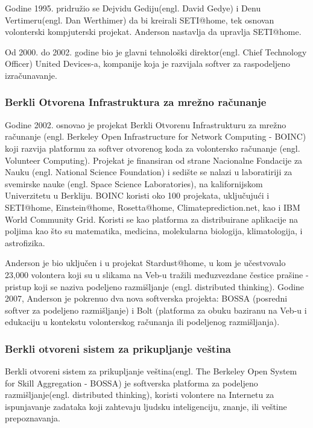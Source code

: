 \documentclass[titlepage, 12pt]{article}
\begin{document}
Godine 1995. pridružio se Dejvidu Gediju(engl. David Gedye) i Denu Vertimeru(engl. Dan Werthimer) da bi kreirali SETI@home, tek osnovan volonterski kompjuterski projekat. Anderson nastavlja da upravlja SETI@home.

Od 2000. do 2002. godine bio je glavni tehnološki direktor(engl. Chief Technology Officer) United Devices-a, kompanije koja je razvijala softver za raspodeljeno izračunavanje.

\subsubsection{Berkli Otvorena Infrastruktura za mrežno računanje}
Godine 2002. osnovao je projekat Berkli Otvorenu Infrastrukturu za mrežno računanje (engl. Berkeley Open Infrastructure for Network Computing - BOINC) koji razvija platformu za softver otvorenog koda za volontersko računanje (engl. Volunteer Computing). Projekat je finansiran od strane Nacionalne Fondacije za Nauku (engl. National Science Foundation) i sedište se nalazi u laboratiriji za svemirske nauke (engl. Space Science Laboratories), na kalifornijskom Univerzitetu u Berkliju. BOINC koristi oko 100 projekata, uključujući i SETI@home, Einstein@home, Rosetta@home, Climateprediction.net, kao i IBM World Community Grid. Koristi se kao platforma za distribuirane aplikacije na poljima kao što su matematika, medicina, molekularna biologija, klimatologija, i astrofizika.

Anderson je bio uključen i u projekat Stardust@home, u kom je učestvovalo 23,000 volontera koji su u slikama na Veb-u tražili međuzvezdane čestice prašine - pristup koji se naziva podeljeno razmišljanje (engl. distributed thinking). Godine 2007, Anderson je pokrenuo dva nova softverska projekta: BOSSA (posredni softver za podeljeno razmišljanje) i Bolt (platforma za obuku baziranu na Veb-u i edukaciju u kontekstu volonterskog računanja ili podeljenog razmišljanja).

\subsubsection{Berkli otvoreni sistem za prikupljanje veština}
Berkli otvoreni sistem za prikupljanje veština(engl. The Berkeley Open System for Skill Aggregation - BOSSA) je softverska platforma za podeljeno razmišljanje(engl. distributed thinking), koristi volontere na Internetu za ispunjavanje zadataka koji zahtevaju ljudsku inteligenciju, znanje, ili veštine prepoznavanja.
\end{document}
